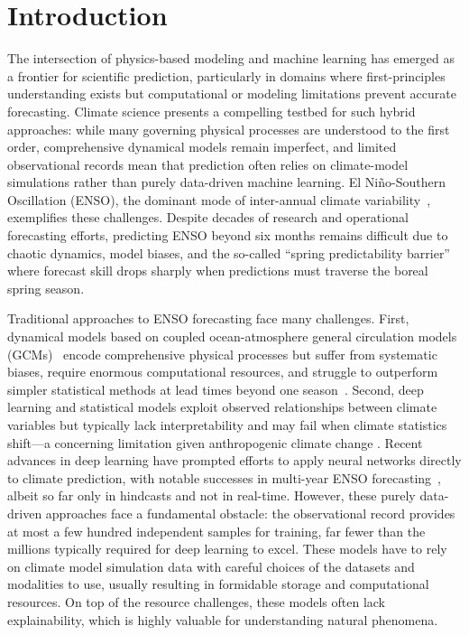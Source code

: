 \section{Introduction}
\label{sec:introduction}

The intersection of physics-based modeling and machine learning has emerged as a frontier for scientific prediction, particularly in domains where first-principles understanding exists but computational or modeling limitations prevent accurate forecasting. Climate science presents a compelling testbed for such hybrid approaches: while many governing physical processes are understood to the first order, comprehensive dynamical models remain imperfect, and limited observational records mean that prediction often relies on climate-model simulations rather than purely data-driven machine learning. El Ni\~no-Southern Oscillation (ENSO), the dominant mode of inter-annual climate variability~\cite{mcphaden2006enso,timmermann2018enso}, exemplifies these challenges. Despite decades of research and operational forecasting efforts, predicting ENSO beyond six months remains difficult due to chaotic dynamics, model biases, and the so-called ``spring predictability barrier''~\cite{webster1992monsoon,duan2013predictability} where forecast skill drops sharply when predictions must traverse the boreal spring season.

Traditional approaches to ENSO forecasting face many challenges. First, dynamical models based on coupled ocean-atmosphere general circulation models (GCMs)~\cite{flato2013evaluation} encode comprehensive physical processes but suffer from systematic biases, require enormous computational resources, and struggle to outperform simpler statistical methods at lead times beyond one season~\cite{barnston2012skill,Latif1998JGR, Jin2008ClimDyn}. Second, deep learning and statistical models exploit observed relationships between climate variables but typically lack interpretability and may fail when climate statistics shift---a concerning limitation given anthropogenic climate change \cite{Dmitri_model, TangangTangMonahanHsieh1998NNEOF,UbilavaHelmers2013STAR, PenlandMagorian1993LIM}.
Recent advances in deep learning have prompted efforts to apply neural networks directly to climate prediction, with notable successes in multi-year ENSO forecasting~\cite{ham2019deep, Hu2021ResCNNENSO, Yan2020TCNENSO, ZhouZhang2023GeoformerENSO, Mu2024ENSOPhyNet}, albeit so far only in hindcasts and not in real-time. However, these purely data-driven approaches face a fundamental obstacle: the observational record provides at most a few hundred independent samples for training, far fewer than the millions typically required for deep learning to excel. These models have to rely on climate model simulation data with careful choices of the datasets and modalities to use, usually resulting in formidable storage and computational resources. On top of the resource challenges, these models often lack explainability, which is highly valuable for understanding natural phenomena.

